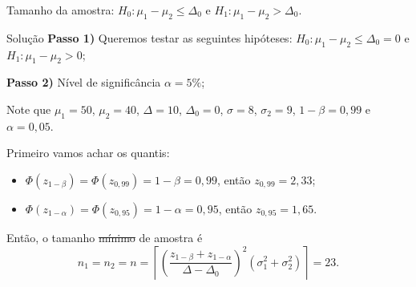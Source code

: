 \documentclass[9pt]{beamer}
\begin{document}
\begin{frame}{Tamanho da amostra: $H_0:\mu_1 - \mu_2 \leq \Delta_0$ e $H_1: \mu_1 - \mu_2 > \Delta_0$.}

\normalsize
\begin{block}{Solução}
	\textbf{Passo 1)} Queremos testar as seguintes hipóteses: $H_0: \mu_1 - \mu_2 \leq \Delta_0 = 0$ e $H_1: \mu_1 - \mu_2 > 0$;
	
	\textbf{Passo 2)} Nível de significância $\alpha=5\%$;
	
	Note que $\mu_1=50$, $\mu_2=40$, $\Delta=10$, $\Delta_0=0$, $\sigma=8$, $\sigma_2=9$, $1-\beta=0,99$ e $\alpha=0,05$. 
	
	Primeiro vamos achar os quantis:
	\begin{itemize}
		\item $\Phi\left(z_{1-\beta}\right)=\Phi\left(z_{0,99}\right)=1-\beta=0,99$, então $z_{0,99}=2,33$;
		\item $\Phi\left(z_{1-\alpha}\right)=\Phi\left(z_{0,95}\right)=1-\alpha=0,95$, então $z_{0,95}=1,65$.
	\end{itemize}
	Então, o tamanho \sout{mínimo} de amostra é
	$$n_1=n_2=n=\left\lceil \left( \frac{z_{1-\beta} + z_{1-\alpha}}{\Delta - \Delta_0}\right)^2 (\sigma_1^2 + \sigma_2^2) \right\rceil = 23.$$
\end{block}

\end{frame}
\end{document}
